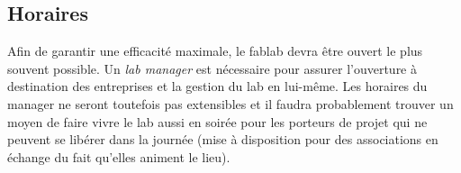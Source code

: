 \subsection{Horaires}

Afin de garantir une efficacité maximale, le fablab devra être ouvert le plus souvent possible. Un \textit{lab manager} est
nécessaire pour assurer l'ouverture à destination des entreprises et la gestion du lab en lui-même. Les horaires du
manager ne seront toutefois pas extensibles et il faudra probablement trouver un moyen de faire vivre le lab aussi en
soirée pour les porteurs de projet qui ne peuvent se libérer dans la journée (mise à disposition pour des associations
en échange du fait qu'elles animent le lieu).
